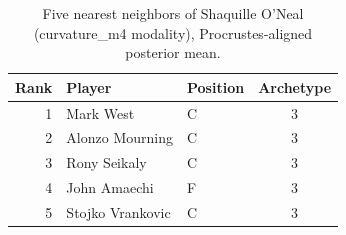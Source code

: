\begin{table}[htbp]
  \centering\small
  \begin{tabular}{rllc}
    \toprule
    Rank & Player & Position & Archetype \\
    \midrule
    1 & Mark West & C & 3 \\
    2 & Alonzo Mourning & C & 3 \\
    3 & Rony Seikaly & C & 3 \\
    4 & John Amaechi & F & 3 \\
    5 & Stojko Vrankovic & C & 3 \\
    \bottomrule
  \end{tabular}
  \caption{Five nearest neighbors of Shaquille O'Neal (curvature_m4 modality), Procrustes-aligned posterior mean.}
  \label{tab:Shaquille_O_Neal_neighbors_curvature_m4}
\end{table}

